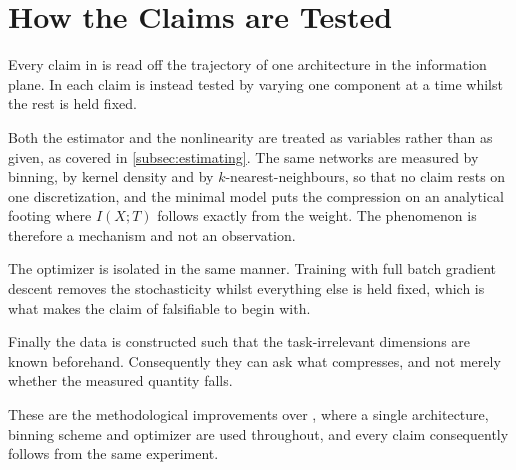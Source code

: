 \section{How the Claims are Tested}\label{sec:testing}
Every claim in \cite{shwartzziv2017} is read off the trajectory of one
architecture in the information plane. In \cite{saxe2018} each claim is
instead tested by varying one component at a time whilst the rest is held
fixed.

Both the estimator and the nonlinearity are treated as variables rather than
as given, as covered in \autoref{subsec:estimating}. The same networks are
measured by binning, by kernel density and by $k$-nearest-neighbours, so that
no claim rests on one discretization, and the minimal model puts the
compression on an analytical footing where $I(X;T)$ follows exactly from the
weight. The phenomenon is therefore a mechanism and not an observation.

The optimizer is isolated in the same manner. Training with full batch
gradient descent removes the stochasticity whilst everything else is held
fixed, which is what makes the claim of \cite{shwartzziv2017} falsifiable to
begin with.

Finally the data is constructed such that the task-irrelevant dimensions are
known beforehand. Consequently they can ask what compresses, and not merely
whether the measured quantity falls.

These are the methodological improvements over \cite{shwartzziv2017}, where a
single architecture, binning scheme and optimizer are used throughout, and
every claim consequently follows from the same experiment.
